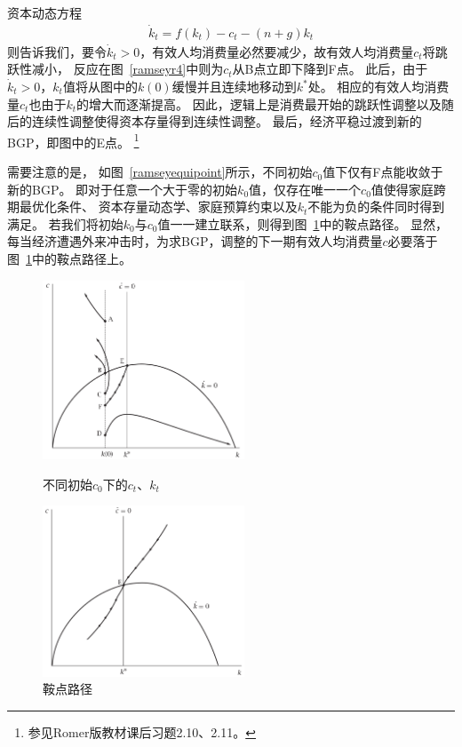 \documentclass[cn,normal,11pt,black]{elegantnote}
\begin{document}
资本动态方程
\begin{align*}
    \dot{k}_t = f(k_t) - c_t - (n+g)k_t
\end{align*}
则告诉我们，要令$\dot{k}_t > 0$，有效人均消费量必然要减少，故有效人均消费量$c_t$将跳跃性减小，
反应在图~\ref{ramseyr4}中则为$c_t$从B点立即下降到F点。
此后，由于$\dot{k}_t > 0$，$k_t$值将从图中的$k(0)$缓慢并且连续地移动到$k^*$处。
相应的有效人均消费量$c_t$也由于$k_t$的增大而逐渐提高。
因此，逻辑上是消费最开始的跳跃性调整以及随后的连续性调整使得资本存量得到连续性调整。
最后，经济平稳过渡到新的BGP，即图中的E点。
\footnote{参见Romer版教材课后习题2.10、2.11。}

需要注意的是，
如图~\ref{ramseyequipoint}所示，不同初始$c_0$值下仅有F点能收敛于新的BGP。
即对于任意一个大于零的初始$k_0$值，仅存在唯一一个$c_0$值使得家庭跨期最优化条件、
资本存量动态学、家庭预算约束以及$k_t$不能为负的条件同时得到满足。
若我们将初始$k_0$与$c_0$值一一建立联系，则得到图~\ref{ramseyr5}中的鞍点路径。
显然，每当经济遭遇外来冲击时，为求BGP，调整的下一期有效人均消费量$c$必要落于图~\ref{ramseyr5}中的鞍点路径上。

\begin{figure}[!htbp]
    \centering
        \begin{minipage}[t]{0.48\textwidth}
            \centering
            \includegraphics[width=6cm]{image/r4.png}
            \caption{不同初始$c_0$下的$c_t$、$k_t$}  \label{ramseyr4}
        \end{minipage}
        \begin{minipage}[t]{0.48\textwidth}
            \centering
            \includegraphics[width=6cm]{image/r5.png}
            \caption{鞍点路径}     \label{ramseyr5}
        \end{minipage}
\end{figure}
\end{document}
